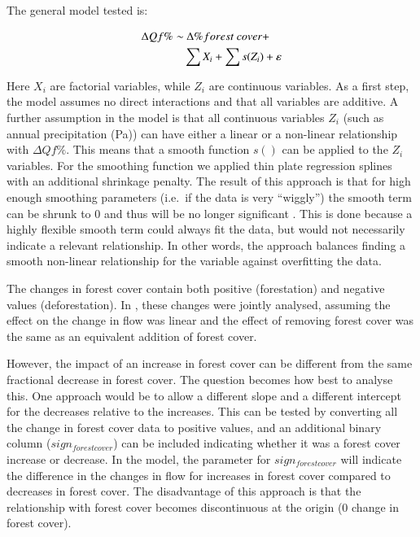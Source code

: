 \documentclass[]{elsarticle} %
\begin{document}
The general model tested is:

\begin{align}
\Delta Qf \% \sim &~ \Delta \% forest~cover + \notag \\ 
& \sum{X_i} + \sum{s(Z_i)} + \varepsilon \label{eq:eq2}
\end{align}

Here \(X_i\) are factorial variables, while \(Z_i\) are continuous variables. As a first step, the model assumes no direct interactions and that all variables are additive. A further assumption in the model is that all continuous variables \(Z_i\) (such as annual precipitation (Pa)) can have either a linear or a non-linear relationship with \(\Delta Qf \%\). This means that a smooth function \(s()\) can be applied to the \(Z_i\) variables. For the smoothing function we applied thin plate regression splines with an additional shrinkage penalty. The result of this approach is that for high enough smoothing parameters (i.e.~if the data is very ``wiggly'') the smooth term can be shrunk to 0 and thus will be no longer significant \citep{wood2006}. This is done because a highly flexible smooth term could always fit the data, but would not necessarily indicate a relevant relationship. In other words, the approach balances finding a smooth non-linear relationship for the variable against overfitting the data.

The changes in forest cover contain both positive (forestation) and negative values (deforestation). In \citet{zhang2017}, these changes were jointly analysed, assuming the effect on the change in flow was linear and the effect of removing forest cover was the same as an equivalent addition of forest cover.

However, the impact of an increase in forest cover can be different from the same fractional decrease in forest cover. The question becomes how best to analyse this. One approach would be to allow a different slope and a different intercept for the decreases relative to the increases.
This can be tested by converting all the change in forest cover data to positive values, and an additional binary column (\(sign_{forest cover}\)) can be included indicating whether it was a forest cover increase or decrease. In the model, the parameter for \(sign_{forest cover}\) will indicate the difference in the changes in flow for increases in forest cover compared to decreases in forest cover. The disadvantage of this approach is that the relationship with forest cover becomes discontinuous at the origin (0 change in forest cover).
\end{document}
